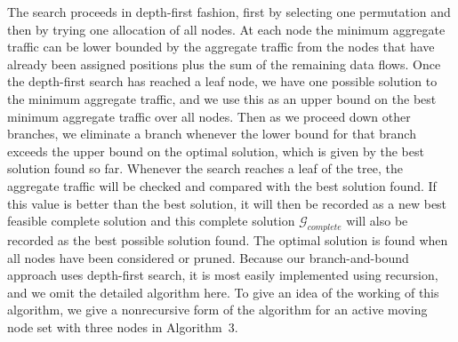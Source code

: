 \documentclass[10pt,conference]{IEEEtran}
\begin{document}
The search proceeds in depth-first fashion, first by selecting one
permutation and then by trying one allocation of all nodes.  At each
node the minimum aggregate traffic can be lower bounded by the
aggregate traffic from the nodes that have already been assigned
positions plus the sum of the remaining data flows.  Once the
depth-first search has reached a leaf node, we have one possible
solution to the minimum aggregate traffic, and we use this as an upper
bound on the best minimum aggregate traffic over all nodes.  Then as
we proceed down other branches, we eliminate a branch whenever the
lower bound for that branch exceeds the upper bound on the optimal
solution, which is given by the best solution found so far.  Whenever
the search reaches a leaf of the tree, the aggregate traffic will be
checked and compared with the best solution found. If this value is
better than the best solution, it will then be recorded as a new best
feasible complete solution and this complete solution
$\mathcal{G}_{complete}$ will also be recorded as the best possible
solution found. The optimal solution is found when all nodes
have been considered or pruned.  Because our branch-and-bound approach
uses depth-first search, it is most easily implemented using
recursion, and we omit the detailed algorithm here.  To give an idea
of the working of this algorithm, we give a nonrecursive form of the
algorithm for an active moving node set with three nodes in
Algorithm~3.
\end{document}

